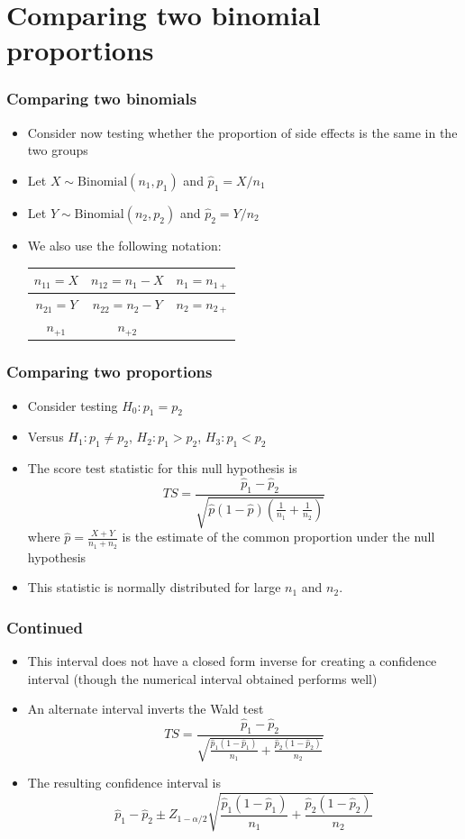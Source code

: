 \documentclass[aspectratio=169]{beamer}
\begin{document}
\section{Comparing two binomial proportions}
\begin{frame}\frametitle{Comparing two binomials}
  \begin{itemize}
  \item Consider now testing whether the proportion of side effects is the same
    in the two groups
  \item Let $X \sim \mathrm{Binomial}(n_1, p_1)$ and $\hat p_1 = X / n_1$
  \item Let $Y \sim \mathrm{Binomial}(n_2, p_2)$ and $\hat p_2 = Y / n_2$
  \item We also use the following notation:
    \begin{center}
      \begin{tabular}{|c|c|c|}\hline
        $n_{11} = X$ & $n_{12} = n_1 - X$ & $n_1 = n_{1+}$ \\ \hline
        $n_{21} = Y$ & $n_{22} = n_2 - Y$ & $n_2 = n_{2+}$ \\ \hline
        $n_{+1}$     & $n_{+2}$           &       \\ \hline 
      \end{tabular}
    \end{center}
  \end{itemize}
\end{frame}

\begin{frame}\frametitle{Comparing two proportions}
  \begin{itemize}
  \item Consider testing $H_0:p_1 = p_2$ 
  \item Versus $H_1:p_1 \neq p_2$, $H_2:p_1>p_2$, $H_3:p_1 < p_2$ 
  \item The score test statistic for this null hypothesis is
    $$
    TS = \frac{\hat p_1 - \hat p_2}{\sqrt{\hat p (1 - \hat p)(\frac{1}{n_1} + \frac{1}{n_2})}}
    $$
    where $\hat p = \frac{X + Y}{n_1 + n_2}$ is the estimate of the
    common proportion under the null hypothesis
  \item This statistic is normally distributed for large $n_1$ and
    $n_2$.
  \end{itemize}
\end{frame}

\begin{frame}\frametitle{Continued}
  \begin{itemize}
  \item This interval does not have a closed form inverse for creating a
    confidence interval (though the numerical interval obtained performs
    well)
  \item An alternate interval inverts the Wald test
    $$
    TS = \frac{\hat p_1 - \hat p_2}{\sqrt{\frac{\hat p_1 (1 - \hat p_1)}{n_1} + \frac{\hat p_2(1 - \hat p_2)}{n_2}}}
    $$
  \item The resulting confidence interval is
    $$
    \hat p_1 - \hat p_2 \pm Z_{1-\alpha / 2}\sqrt{\frac{\hat p_1 (1 - \hat p_1)}{n_1} + \frac{\hat p_2(1 - \hat p_2)}{n_2}}
    $$
    \end{itemize}
  \end{frame}
\end{document}
